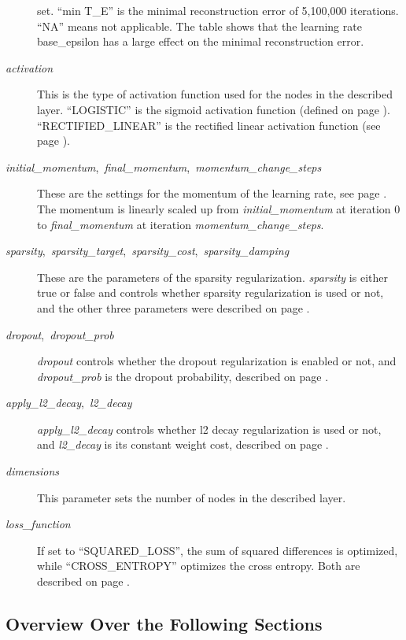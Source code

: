 \begin{description}
\begin{table}
{set. ``min T\_E'' is the minimal reconstruction error of 5,100,000
iterations. ``NA'' means not applicable. The table shows that the
learning rate base\_epsilon has a large effect on the minimal reconstruction
error.}
\end{table}
\item [{\emph{activation}}] This is the type of activation function used
for the nodes in the described layer. ``LOGISTIC'' is the sigmoid
activation function (defined on page \pageref{The-sigmoid-activation-function}).
``RECTIFIED\_LINEAR'' is the rectified linear activation function
(see page \pageref{par:Rectified-linear-activation-function}).
\item [{\emph{initial\_momentum},~\emph{final\_momentum},~\emph{momentum\_change\_steps}}] These
are the settings for the momentum of the learning rate, see page \pageref{par:Momentum-of-the-learning-rule}.
The momentum is linearly scaled up from \emph{initial\_momentum} at
iteration 0 to \emph{final\_momentum }at iteration \emph{momentum\_change\_steps}.
\item [{\emph{sparsity},~\emph{sparsity\_target},~\emph{sparsity\_cost},~\emph{sparsity\_damping}}] These
are the parameters of the sparsity regularization. \emph{sparsity}
is either true or false and controls whether sparsity regularization
is used or not, and the other three parameters were described on page
\pageref{subsec:Sparsity-Target}.
\item [{\emph{dropout},~\emph{dropout\_prob}}] \emph{dropout }controls
whether the dropout regularization is enabled or not, and \emph{dropout\_prob
}is the dropout probability, described on page \pageref{subsec:Dropout}.
\item [{\emph{apply\_l2\_decay},~\emph{l2\_decay}}] \emph{apply\_l2\_decay}
controls whether l2 decay regularization is used or not, and \emph{l2\_decay}
is its constant weight cost, described on page \pageref{subsec:L1-and-L2-Weight-Decay}.
\item [{\emph{dimensions}}] This parameter sets the number of nodes in
the described layer.
\item [{\emph{loss\_function}}] If set to ``SQUARED\_LOSS'', the sum
of squared differences is optimized, while ``CROSS\_ENTROPY'' optimizes
the cross entropy. Both are described on page \pageref{par:Optimizing-the-Sum-of-Squared-DIfferences}.
\end{description}

\subsection{Overview Over the Following Sections}

